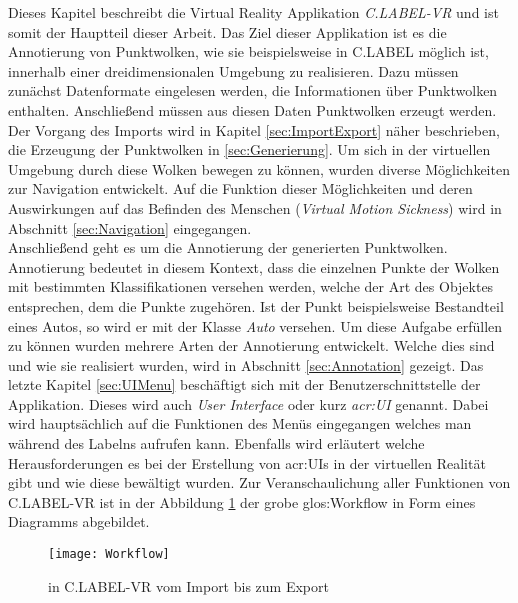 \graphicspath{{Kapitel/Kapitel4_Hauptteil/Images/}}

Dieses Kapitel beschreibt die Virtual Reality Applikation \textit{C.LABEL-VR} und ist somit der Hauptteil dieser Arbeit. Das Ziel dieser Applikation ist es die Annotierung von Punktwolken, wie sie beispielsweise in C.LABEL möglich ist, innerhalb einer dreidimensionalen Umgebung zu realisieren. Dazu müssen zunächst Datenformate eingelesen werden, die Informationen über Punktwolken enthalten. Anschließend müssen aus diesen Daten Punktwolken erzeugt werden. Der Vorgang des Imports wird in Kapitel \ref{sec:ImportExport} näher beschrieben, die Erzeugung der Punktwolken in \ref{sec:Generierung}. Um sich in der virtuellen Umgebung durch diese Wolken bewegen zu können, wurden diverse Möglichkeiten zur Navigation entwickelt. Auf die Funktion dieser Möglichkeiten und deren Auswirkungen auf das Befinden des Menschen (\textit{Virtual Motion Sickness}) wird in Abschnitt \ref{sec:Navigation} eingegangen.\\

Anschließend geht es um die Annotierung der generierten Punktwolken. Annotierung bedeutet in diesem Kontext, dass die einzelnen Punkte der Wolken mit bestimmten Klassifikationen versehen werden, welche der Art des Objektes entsprechen, dem die Punkte zugehören. Ist der Punkt beispielsweise Bestandteil eines Autos, so wird er mit der Klasse \textit{Auto} versehen. Um diese Aufgabe erfüllen zu können wurden mehrere Arten der Annotierung entwickelt. Welche dies sind und wie sie realisiert wurden, wird in Abschnitt \ref{sec:Annotation} gezeigt. Das letzte Kapitel \ref{sec:UIMenu} beschäftigt sich mit der Benutzerschnittstelle der Applikation. Dieses wird auch \textit{User Interface} oder kurz \textit{\acrshort{acr:UI}} genannt. Dabei wird hauptsächlich auf die Funktionen des Menüs eingegangen welches man während des Labelns aufrufen kann. Ebenfalls wird erläutert welche Herausforderungen es bei der Erstellung von \acrshort{acr:UI}s in der virtuellen Realität gibt und wie diese bewältigt wurden. Zur Veranschaulichung aller Funktionen von C.LABEL-VR ist in der Abbildung \ref{fig:Workflow} der grobe \gls{glos:Workflow} in Form eines Diagramms abgebildet.

\begin{figure}%
	\centering
    \texttt{[image: Workflow]}
    \caption{ in C.LABEL-VR vom Import bis zum Export}
    \label{fig:Workflow}
\end{figure}

